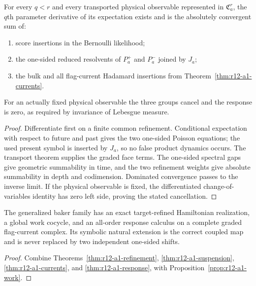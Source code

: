 \begin{theorem}
\label{thm:r12-a1-response}
For every $q<r$ and every transported physical observable represented in
$\mathfrak C_a^r$, the $q$th parameter derivative of its expectation exists
and is the absolutely convergent sum of:
\begin{enumerate}[label=(\roman*)]
\item score insertions in the Bernoulli likelihood;
\item the one-sided reduced resolvents of $P_a^+$ and $P_a^-$ joined by $J_a$;
\item the bulk and all flag-current Hadamard insertions from
      Theorem~\ref{thm:r12-a1-currents}.
\end{enumerate}
For an actually fixed physical observable the three groups cancel and the
response is zero, as required by invariance of Lebesgue measure.
\end{theorem}

\begin{proof}
Differentiate first on a finite common refinement.  Conditional expectation
with respect to future and past gives the two one-sided Poisson equations; the
used present symbol is inserted by $J_a$, so no false product dynamics occurs.
The transport theorem supplies the graded face terms.  The one-sided spectral
gaps give geometric summability in time, and the two refinement weights give
absolute summability in depth and codimension.  Dominated convergence passes
to the inverse limit.  If the physical observable is fixed, the differentiated
change-of-variables identity has zero left side, proving the stated
cancellation.
\end{proof}

\begin{theorem}
\label{thm:r12-a1-main}
The generalized baker family has an exact target-refined Hamiltonian
realization, a global work cocycle, and an all-order response calculus on a
complete graded flag-current complex.  Its symbolic natural extension is the
correct coupled map and is never replaced by two independent one-sided
shifts.
\end{theorem}

\begin{proof}
Combine Theorems~\ref{thm:r12-a1-refinement},
\ref{thm:r12-a1-suspension}, \ref{thm:r12-a1-currents}, and
\ref{thm:r12-a1-response}, with Proposition~\ref{prop:r12-a1-work}.
\end{proof}
